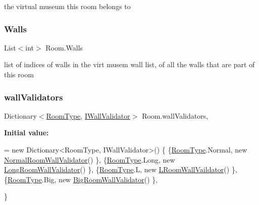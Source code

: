 the virtual museum this room belongs to 

\mbox{\label{class_room_a22669d53756bbfecb106f4f6c9529bb9}} 
\subsubsection{\texorpdfstring{Walls}{Walls}}
{\footnotesize\ttfamily List$<$int$>$ Room.\+Walls}



list of indices of walls in the virt musem wall list, of all the walls that are part of this room 

\mbox{\label{class_room_a274899cf7b41ac5190fb7754817510d6}} 
\subsubsection{\texorpdfstring{wall\+Validators}{wallValidators}}
{\footnotesize\ttfamily Dictionary$<$\mbox{\hyperlink{_room_8cs_ab540f7414f306325d92272bcef1e34e1}{Room\+Type}}, \mbox{\hyperlink{interface_i_wall_validator}{I\+Wall\+Validator}}$>$ Room.\+wall\+Validators\hspace{0.3cm}{\ttfamily [static]}, {\ttfamily [private]}}

{\bfseries Initial value\+:}
\begin{DoxyCode}
= \textcolor{keyword}{new} Dictionary<RoomType, IWallValidator>()
    \{
        \{\mbox{\hyperlink{_room_8cs_ab540f7414f306325d92272bcef1e34e1}{RoomType}}.Normal, \textcolor{keyword}{new} \mbox{\hyperlink{class_normal_room_wall_validator}{NormalRoomWallValidator}}() \},
        \{\mbox{\hyperlink{_room_8cs_ab540f7414f306325d92272bcef1e34e1}{RoomType}}.Long, \textcolor{keyword}{new} \mbox{\hyperlink{class_long_room_wall_validator}{LongRoomWallValidator}}() \},
        \{\mbox{\hyperlink{_room_8cs_ab540f7414f306325d92272bcef1e34e1}{RoomType}}.L, \textcolor{keyword}{new} \mbox{\hyperlink{class_l_room_wall_vaildator}{LRoomWallVaildator}}() \},
        \{\mbox{\hyperlink{_room_8cs_ab540f7414f306325d92272bcef1e34e1}{RoomType}}.Big, \textcolor{keyword}{new} \mbox{\hyperlink{class_big_room_wall_validator}{BigRoomWallValidator}}() \},

    \}
\end{DoxyCode}


